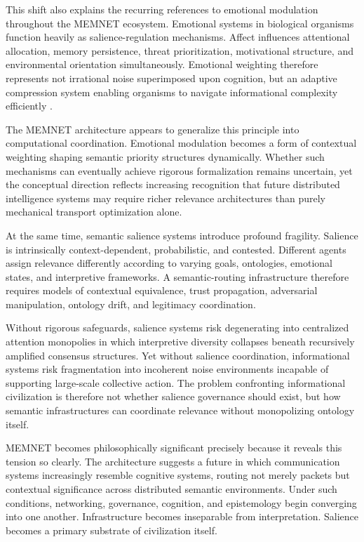 \documentclass[11pt,a4paper]{article}
\begin{document}
This shift also explains the recurring references to emotional modulation throughout the MEMNET ecosystem. Emotional systems in biological organisms function heavily as salience-regulation mechanisms. Affect influences attentional allocation, memory persistence, threat prioritization, motivational structure, and environmental orientation simultaneously. Emotional weighting therefore represents not irrational noise superimposed upon cognition, but an adaptive compression system enabling organisms to navigate informational complexity efficiently \cite{friston2010}.

The MEMNET architecture appears to generalize this principle into computational coordination. Emotional modulation becomes a form of contextual weighting shaping semantic priority structures dynamically. Whether such mechanisms can eventually achieve rigorous formalization remains uncertain, yet the conceptual direction reflects increasing recognition that future distributed intelligence systems may require richer relevance architectures than purely mechanical transport optimization alone.

At the same time, semantic salience systems introduce profound fragility. Salience is intrinsically context-dependent, probabilistic, and contested. Different agents assign relevance differently according to varying goals, ontologies, emotional states, and interpretive frameworks. A semantic-routing infrastructure therefore requires models of contextual equivalence, trust propagation, adversarial manipulation, ontology drift, and legitimacy coordination.

Without rigorous safeguards, salience systems risk degenerating into centralized attention monopolies in which interpretive diversity collapses beneath recursively amplified consensus structures. Yet without salience coordination, informational systems risk fragmentation into incoherent noise environments incapable of supporting large-scale collective action. The problem confronting informational civilization is therefore not whether salience governance should exist, but how semantic infrastructures can coordinate relevance without monopolizing ontology itself.

MEMNET becomes philosophically significant precisely because it reveals this tension so clearly. The architecture suggests a future in which communication systems increasingly resemble cognitive systems, routing not merely packets but contextual significance across distributed semantic environments. Under such conditions, networking, governance, cognition, and epistemology begin converging into one another. Infrastructure becomes inseparable from interpretation. Salience becomes a primary substrate of civilization itself.
\end{document}
